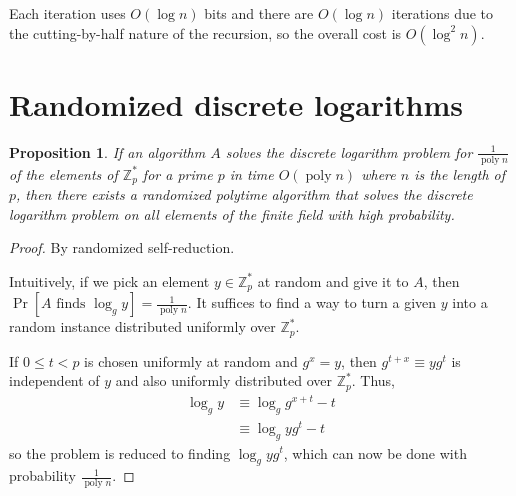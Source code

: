 \documentclass[letterpaper,11pt]{article}
\newtheorem{prop}{Proposition}
\DeclareMathOperator{\PrOp}{Pr}
\DeclareMathOperator{\poly}{poly}
\renewcommand{\Pr}[1]{\PrOp{\left[\text{#1}\right]}}
\newcommand{\Z}{\mathbb{Z}}
\begin{document}
Each iteration uses $O(\log n)$ bits and there are $O(\log n)$ iterations due
to the cutting-by-half nature of the recursion, so the overall cost is
$O(\log^2 n)$.

\section{Randomized discrete logarithms}

\begin{prop}
    If an algorithm $A$ solves the discrete logarithm problem for
    $\frac{1}{\poly{n}}$ of the elements of $\Z_p^*$ for a prime $p$ in time
    $O(\poly n)$ where $n$ is the length of $p$, then there exists a randomized
    polytime algorithm that solves the discrete logarithm problem on all
    elements of the finite field with high probability.
\end{prop}

\begin{proof} By randomized self-reduction.

    Intuitively, if we pick an element $y \in \Z_p^*$ at random and give it to
    $A$, then $\Pr{$A$ finds $\log_g y$} = \frac{1}{\poly n}$. It
    suffices to find a way to turn a given $y$ into a random instance
    distributed uniformly over $\Z_p^*$.

    If $0 \leq t < p$ is chosen uniformly at random and $g^x = y$, then
    $g^{t+x} \equiv yg^t$ is independent of $y$ and also uniformly distributed
    over $\Z_p^*$. Thus,
    \begin{align*}
        \log_g y
            &\equiv \log_g{g^{x+t}} - t \\
            &\equiv \log_g{yg^t} - t
    \end{align*}
    so the problem is reduced to finding $\log_g{yg^t}$, which can now be done
    with probability $\frac{1}{\poly n}$.
\end{proof}
\end{document}
